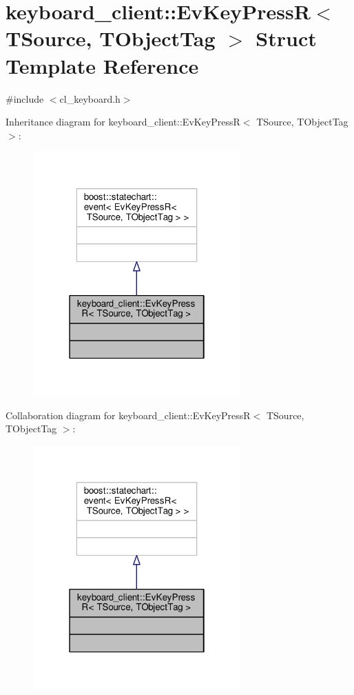 \hypertarget{structkeyboard__client_1_1EvKeyPressR}{}\section{keyboard\+\_\+client\+:\+:Ev\+Key\+PressR$<$ T\+Source, T\+Object\+Tag $>$ Struct Template Reference}
\label{structkeyboard__client_1_1EvKeyPressR}


{\ttfamily \#include $<$cl\+\_\+keyboard.\+h$>$}



Inheritance diagram for keyboard\+\_\+client\+:\+:Ev\+Key\+PressR$<$ T\+Source, T\+Object\+Tag $>$\+:\nopagebreak
\begin{figure}[H]
\begin{center}
\leavevmode
\includegraphics[width=226pt]{structkeyboard__client_1_1EvKeyPressR__inherit__graph}
\end{center}
\end{figure}


Collaboration diagram for keyboard\+\_\+client\+:\+:Ev\+Key\+PressR$<$ T\+Source, T\+Object\+Tag $>$\+:\nopagebreak
\begin{figure}[H]
\begin{center}
\leavevmode
\includegraphics[width=226pt]{structkeyboard__client_1_1EvKeyPressR__coll__graph}
\end{center}
\end{figure}


